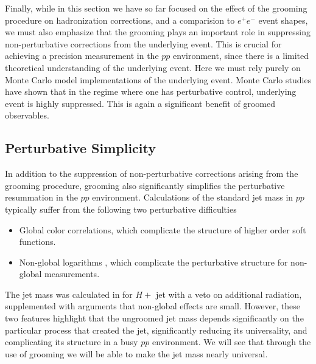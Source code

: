Finally, while in this section we have so far focused on the effect of the grooming procedure on hadronization corrections, and a comparision to $e^+e^-$ event shapes, we must also emphasize that the grooming plays an important role in suppressing non-perturbative corrections from the underlying event. This is crucial for achieving a precision measurement in the $pp$ environment, since there is a limited theoretical understanding of the underlying event. Here we must rely purely on Monte Carlo model implementations of the underlying event.  Monte Carlo studies have shown that in the regime where one has perturbative control, underlying event is highly suppressed. This is again a significant benefit of groomed observables. 




\subsection{Perturbative Simplicity}
\label{sec:pertsimplicity}


In addition to the suppression of non-perturbative corrections arising from the grooming procedure, grooming also significantly simplifies the perturbative resummation in the $pp$ environment. Calculations of the standard jet mass in $pp$ typically suffer from the following two perturbative difficulties
\begin{itemize}
\item Global color correlations, which complicate the structure of higher order soft functions.
\item Non-global logarithms \cite{Dasgupta:2001sh}, which complicate the perturbative structure for non-global measurements.
\end{itemize}
The jet mass was calculated in \cite{Jouttenus:2013hs}  for $H+$ jet with a
veto on additional radiation, supplemented with arguments that
non-global effects are small. However, these two features highlight
that the ungroomed jet mass depends significantly on the particular
process that created the jet, significantly reducing its universality,
and complicating its structure in a busy $pp$ environment. We will see
that through the use of grooming we will be able to make the jet mass
nearly universal.


